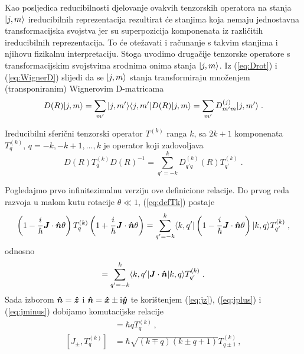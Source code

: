 Kao posljedica reducibilnosti djelovanje ovakvih tenzorskih operatora na 
stanja $| j,m \rangle$ ireducibilnih reprezentacija rezultirat će stanjima
koja nemaju jednostavna transformacijska svojstva jer
su superpozicija komponenata iz različitih ireducibilnih reprezentacija. To će
otežavati i računanje s takvim stanjima i njihovu fizikalnu interpretaciju.
Stoga uvodimo drugačije tenzorske operatore s 
transformacijskim svojstvima srodnima onima stanja $| j,m \rangle$.
Iz (\ref{eq:Drot}) i (\ref{eq:WignerD}) slijedi da se  $| j,m \rangle$
stanja transformiraju množenjem (transponiranim) Wignerovim D-matricama
\begin{equation}
 D(R) | j,m \rangle = \sum_{m'} | j,m' \rangle\langle j,m' |D(R)| j,m \rangle
               = \sum_{m'} D^{(j)}_{m'm}| j,m' \rangle \;.
\end{equation}
\begin{definicija}
   
Ireducibilni sferični tenzorski operator $T^{(k)}$ ranga $k$, sa
$2k+1$ komponenata $T^{(k)}_q$, $q=-k,-k+1,\ldots,k$ je operator
koji zadovoljava
\begin{equation}
 D(R) T^{(k)}_q D(R)^{-1} = \sum_{q'=-k}^{k} D^{(k)}_{q'q}(R)
      T^{(k)}_{q'} \;.
      \label{eq:defTk}
\end{equation}
\end{definicija}
Pogledajmo prvo infinitezimalnu verziju ove definicione relacije.
Do prvog reda razvoja u malom kutu rotacije $\theta \ll 1$, 
(\ref{eq:defTk}) postaje
\begin{equation}
    \left(1-\frac{i}{\hbar}\vec{J}\cdot\unitn \theta\right)
       T^{(k)}_q
    \left(1+\frac{i}{\hbar}\vec{J}\cdot\unitn \theta\right)
    = \sum_{q'=-k}^{k} \bra{k, q'} 
    \left(1-\frac{i}{\hbar}\vec{J}\cdot\unitn \theta\right)
    \ket{k, q}
      T^{(k)}_{q'} \;,
\end{equation}
odnosno
\begin{equation}
    [\vec{J}\cdot\unitn, T^{(k)}_q] 
    = \sum_{q'=-k}^{k} \bra{k, q'} \vec{J}\cdot\unitn \ket{k, q}
      T^{(k)}_{q'} \;.
\end{equation}
Sada izborom $\unitn = \vec{\hat{z}}$ i
$\unitn = \vec{\hat{x}} \pm \rmi \vec{\hat{y}}$
te korištenjem (\ref{eq:jz}), (\ref{eq:jplus}) i (\ref{eq:jminus}) 
dobijamo komutacijske relacije
\begin{align}
[J_z, T^{(k)}_q ] &= \hbar q T^{(k)}_q \,, \\
[J_\pm, T^{(k)}_q] &= \hbar \sqrt{(k\mp q)(k\pm q +1)} T^{(k)}_{q\pm 1} \,,
\end{align}
